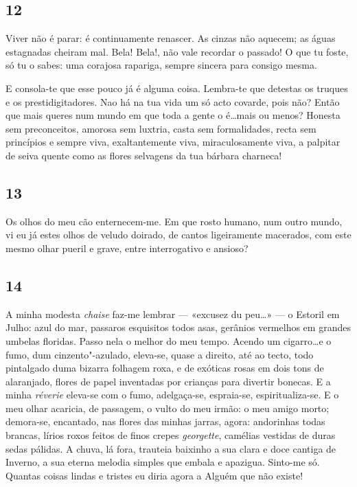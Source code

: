 \subsection{12}

Viver não é parar: é continuamente renascer.
As cinzas não aquecem; as águas estagnadas cheiram
mal. Bela! Bela!, não vale recordar o passado! O que
tu foste, só tu o sabes: uma corajosa rapariga, sempre
sincera para consigo mesma.

E consola-te que esse pouco já é alguma coisa. 
Lembra-te que detestas os truques e os prestidigitadores.
Nao há na tua vida um só acto covarde, pois não?
Então que mais queres num mundo em que toda a
gente o é\ldots mais ou menos? Honesta sem 
preconceitos, amorosa sem luxtria, casta sem formalidades,
recta sem princípios e sempre viva, exaltantemente
viva, miraculosamente viva, a palpitar de seiva
quente como as flores selvagens da tua bárbara
charneca!

\subsection{13}

Os olhos do meu cão enternecem-me. Em que
rosto humano, num outro mundo, vi eu já estes olhos
de veludo doirado, de cantos ligeiramente macerados,
com este mesmo olhar pueril e grave, entre 
interrogativo e ansioso?

\subsection{14} 

A minha modesta \textit{chaise} faz-me lembrar — 
«excusez du peu\ldots» — o Estoril em Julho: azul do mar,
passaros esquisitos todos asas, gerânios vermelhos em
grandes umbelas floridas. Passo nela o melhor do meu
tempo. Acendo um cigarro\ldots e o fumo, dum cinzento"-azulado,
eleva-se, quase a direito, até ao tecto, todo
pintalgado duma bizarra folhagem roxa, e de exóticas
rosas em dois tons de alaranjado, flores de papel 
inventadas por crianças para divertir bonecas. E a minha
\textit{réverie} eleva-se com o fumo, adelgaça-se, espraia-se,
espiritualiza-se. E o meu olhar acaricia, de passagem,
o vulto do meu irmão: o meu amigo morto; demora-se,
encantado, nas flores das minhas jarras, agora: andorinhas
todas brancas, lírios roxos feitos de finos crepes
\textit{georgette}, camélias vestidas de duras sedas
pálidas. A chuva, lá fora, trauteia baixinho a sua clara
e doce cantiga de Inverno, a sua eterna melodia simples
que embala e apazigua. Sinto-me só. Quantas coisas
lindas e tristes eu diria agora a Alguém que não
existe!

